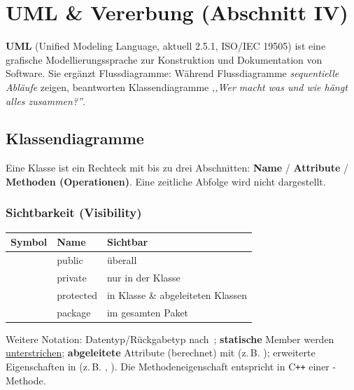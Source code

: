 \section{UML \& Vererbung (Abschnitt IV)}
\textbf{UML} (Unified Modeling Language, aktuell 2.5.1, ISO/IEC 19505) ist eine grafische Modellierungssprache zur Konstruktion und Dokumentation von Software. Sie erg\"anzt Flussdiagramme: W\"ahrend Flussdiagramme \emph{sequentielle Abl\"aufe} zeigen, beantworten Klassendiagramme \emph{,,Wer macht was und wie h\"angt alles zusammen?''}.

\subsection{Klassendiagramme}
Eine Klasse ist ein Rechteck mit bis zu drei Abschnitten: \textbf{Name} / \textbf{Attribute} / \textbf{Methoden (Operationen)}. Eine zeitliche Abfolge wird nicht dargestellt.

\subsubsection*{Sichtbarkeit (Visibility)}
\begin{center}\small
\begin{tabular}{@{}cll@{}}
\toprule
\textbf{Symbol} & \textbf{Name} & \textbf{Sichtbar} \\
\midrule
\code{+} & public    & \"uberall \\
\code{-} & private   & nur in der Klasse \\
\code{\#} & protected & in Klasse \& abgeleiteten Klassen \\
\code{\textasciitilde} & package & im gesamten Paket \\
\bottomrule
\end{tabular}
\end{center}
Weitere Notation: Datentyp/R\"uckgabetyp nach \code{:}\,; \textbf{statische} Member werden \underline{unterstrichen}; \textbf{abgeleitete} Attribute (berechnet) mit \code{/} (z.\,B. ); erweiterte Eigenschaften in \code{\{ \}} (z.\,B. , ). Die Methodeneigenschaft  entspricht in C\texttt{++} einer -Methode.

\begin{syntaxbox}
 \\
\end{syntaxbox}

